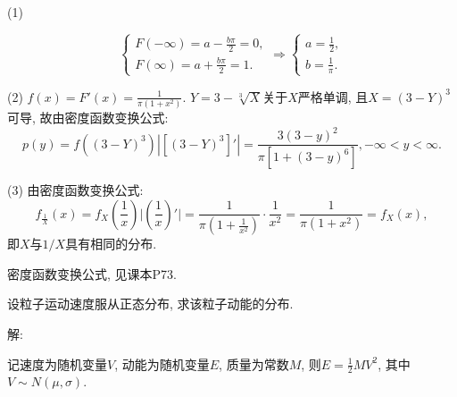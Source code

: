 \documentclass[standard]{ExBook}
\begin{document}
\begin{qitems}
\begin{bbox}
(1)
\vspace{-2em}
\begin{center}
\begin{equation}
    \left\{
    \begin{array}{cl}
        \nonumber
        F(-\infty)=a-\displaystyle\frac{b\pi}{2}=0,\\
        F(\infty)=a+\displaystyle\frac{b\pi}{2}=1.
    \end{array}
    \right.
    \Longrightarrow
    \left\{
    \begin{array}{cl}
        \nonumber
        a=\displaystyle\frac{1}{2},\\
        b=\displaystyle\frac{1}{\pi}.
    \end{array}
    \right.
\end{equation}
\end{center}

(2) $f(x)=F'(x)=\displaystyle\frac{1}{\pi(1+x^2)}$. $Y=3-\sqrt[3]{X}$关于$X$严格单调, 且$X=(3-Y)^{3}$可导, 故由密度函数变换公式:
$$p(y)=f((3-Y)^{3})|[(3-Y)^{3}]'|=\frac{3(3-y)^2}{\pi[1+(3-y)^6]},-\infty < y < \infty.$$
    \end{bbox}

\vspace{-5em}

    \begin{bbox}
(3) 由密度函数变换公式:
$$f_{\frac{1}{X}}(x)=f_{X}(\frac{1}{x})\bigg|\left(\frac{1}{x}\right)'\bigg|=\frac{1}{\pi(1+\frac{1}{x^2})}\cdot\frac{1}{x^2}=\frac{1}{\pi(1+x^2)}=f_{X}(x),$$
即$X$与$1/X$具有相同的分布.

\textcolor{themeColor}{\selectfont {} 密度函数变换公式, 见课本P73.}
    \end{bbox}

\vspace{-5em}

    \begin{bbox}
    \begin{shaded}
        \qitem
设粒子运动速度服从正态分布, 求该粒子动能的分布.
    \end{shaded}
    \end{bbox}

\vspace{-5em}

    \begin{bbox}
解:

记速度为随机变量$V$, 动能为随机变量$E$, 质量为常数$M$, 则$E=\frac{1}{2}M V^2$, 其中$V\sim N(\mu,\sigma)$.


\end{bbox}
\end{qitems}
\end{document}
